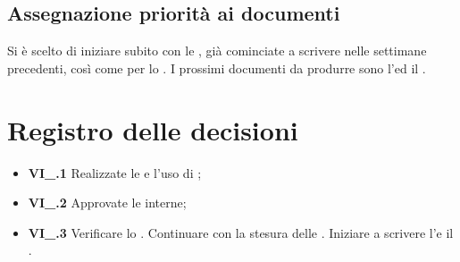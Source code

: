 \subsection{Assegnazione priorità ai documenti}
Si è scelto di iniziare subito con le \NdP, già cominciate a scrivere nelle settimane precedenti, così come per lo \SdF. I prossimi documenti da produrre sono l'\AdR ed il \PdP.

\section{Registro delle decisioni}
\begin{itemize}
  \item \textbf{VI\_\Data.1} Realizzate le   e l'uso di ;
  \item \textbf{VI\_\Data.2} Approvate le  interne;
  \item \textbf{VI\_\Data.3} Verificare lo \SdF. Continuare con la stesura delle \NdP. Iniziare a scrivere l'\AdR e il \PdP.
\end{itemize}